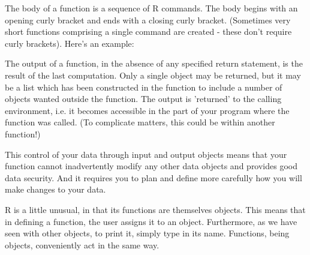 \documentclass[titlepage]{book}\usepackage{knitr}
\begin{document}
The body of a function is a sequence of R commands. The body begins with an opening curly bracket and ends with a closing curly bracket. (Sometimes very short functions comprising a single command are created - these don't require curly brackets). Here's an example:

\begin{knitrout}
\color{fgcolor}\begin{kframe}
\begin{alltt}
 \hlkwb{<-} \hlstd{(}\hlstd{)}  \hlstd{(}\hlopt{+}\hlopt{^}\hlstd{))}
\hlstd{(}\hlstd{)}
\end{alltt}
\end{kframe}
\end{knitrout}


The output of a function, in the absence of any specified return statement, is the result of the last computation. Only a single object may be returned, but it may be a list which has been constructed in the function to include a number of objects wanted outside the function. The output is 'returned' to the calling environment, i.e. it becomes accessible in the part of your program where the function was called. (To complicate matters, this could be within another function!)

This control of your data through input and output objects means that your function cannot inadvertently modify any other data objects and provides good data security. And it requires you to plan and define more carefully how you will make changes to your data.

R is a little unusual, in that its functions are themselves objects. This means that in defining a function, the user assigns it to an object. Furthermore, as we have seen with other objects, to print it, simply type in its name. Functions, being objects, conveniently act in the same way.
\end{document}
